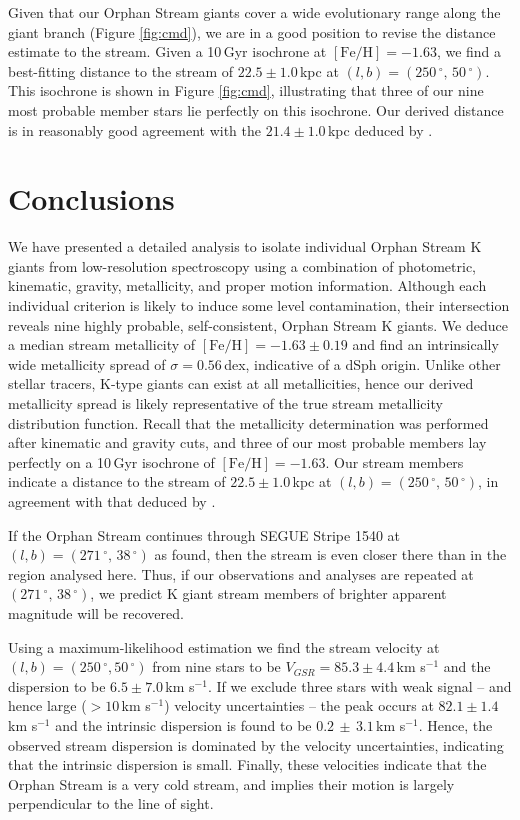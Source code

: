 \documentclass[10pt,apjl]{emulateapj}
\begin{document}
Given that our Orphan Stream giants cover a wide evolutionary range along the giant branch (Figure \ref{fig:cmd}), we are in a good position to revise the distance estimate to the stream. Given a 10\,Gyr \citet{Girardi_et-al_2008} isochrone at $[\mbox{Fe/H}] = -1.63$, we find a best-fitting distance to the stream of $22.5 \pm 1.0$\,kpc at $(l, b) = (250\,^\circ,\,50\,^\circ)$. This isochrone is shown in Figure \ref{fig:cmd}, illustrating that three of our nine most probable member stars lie perfectly on this isochrone. Our derived distance is in reasonably good agreement with the $21.4 \pm 1.0$\,kpc deduced by \citet{Newberg_et-al_2010}.


\section{Conclusions}
\label{sec:conclusions}

We have presented a detailed analysis to isolate individual Orphan Stream K giants from low-resolution spectroscopy using a combination of photometric, kinematic, gravity, metallicity, and proper motion information. Although each individual criterion is likely to induce some level contamination, their intersection reveals nine highly probable, self-consistent, Orphan Stream K giants.  We deduce a median stream metallicity of $[\mbox{Fe/H}] = -1.63 \pm 0.19$ and find an intrinsically wide metallicity spread of $\sigma = 0.56$\,dex, indicative of a dSph origin. Unlike other stellar tracers, K-type giants can exist at all metallicities, hence our derived metallicity spread is likely representative of the true stream metallicity distribution function. Recall that the metallicity determination was performed after kinematic and gravity cuts, and three of our most probable members lay perfectly on a 10\,Gyr isochrone of $[\mbox{Fe/H}] = -1.63$. Our stream members indicate a distance to the stream of $22.5 \pm 1.0$\,kpc at $(l, b) = (250\,^\circ,\,50\,^\circ)$, in agreement with that deduced by \citet{Newberg_et-al_2010}.

If the Orphan Stream continues through SEGUE Stripe 1540 at $(l, b) = (271\,^\circ,\,38\,^\circ)$ as \citet{Newberg_et-al_2010} found, then the stream is even closer there than in the region analysed here. Thus, if our observations and analyses are repeated at $(271\,^\circ,\,38\,^\circ)$, we predict K giant stream members of brighter apparent magnitude will be recovered.

Using a maximum-likelihood estimation we find the stream velocity at $(l, b) = (250\,^\circ, 50\,^\circ)$ from nine stars to be $V_{GSR} = 85.3 \pm 4.4$\,km s$^{-1}$ and the dispersion to be $6.5 \pm 7.0$\,km s$^{-1}$. If we exclude three stars with weak signal \--- and hence large ($> 10$\,km s$^{-1}$) velocity uncertainties \--- the peak occurs at $82.1 \pm 1.4$\,km s$^{-1}$ and the intrinsic dispersion is found to be $0.2\,\pm\,3.1$\,km s$^{-1}$. Hence, the observed stream dispersion is dominated by the velocity uncertainties, indicating that the intrinsic dispersion is small. Finally, these velocities indicate that the Orphan Stream is a very cold stream, and implies their motion is largely perpendicular to the line of sight.
\end{document}
